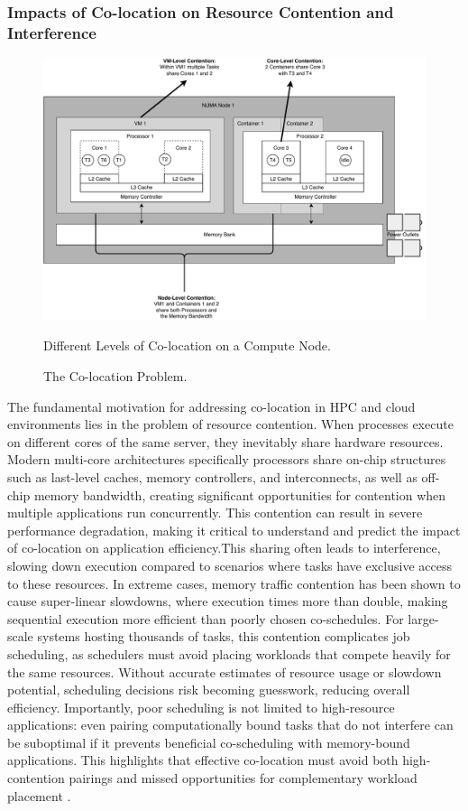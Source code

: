 \subsubsection{Impacts of Co-location on Resource Contention and Interference}
\label{sec:background_colocation_interference}

\begin{figure}[H]
    \centering
    \includegraphics[scale=0.5]{fig/02/02-coloc-overview.pdf}
    \caption{The Co-location Problem.}
    \label{fig:02-coloc-overview}
    \tiny
    Different Levels of Co-location on a Compute Node.
\end{figure}

The fundamental motivation for addressing co-location in HPC and cloud environments lies in the problem of resource contention. When processes execute on different cores of the same server, they inevitably share hardware resources. Modern multi-core architectures specifically processors share on-chip structures such as last-level caches, memory controllers, and interconnects, as well as off-chip memory bandwidth, creating significant opportunities for contention when multiple applications run concurrently. This contention can result in severe performance degradation, making it critical to understand and predict the impact of co-location on application efficiency.This sharing often leads to interference, slowing down execution compared to scenarios where tasks have exclusive access to these resources. In extreme cases, memory traffic contention has been shown to cause super-linear slowdowns, where execution times more than double, making sequential execution more efficient than poorly chosen co-schedules. For large-scale systems hosting thousands of tasks, this contention complicates job scheduling, as schedulers must avoid placing workloads that compete heavily for the same resources. Without accurate estimates of resource usage or slowdown potential, scheduling decisions risk becoming guesswork, reducing overall efficiency. Importantly, poor scheduling is not limited to high-resource applications: even pairing computationally bound tasks that do not interfere can be suboptimal if it prevents beneficial co-scheduling with memory-bound applications. This highlights that effective co-location must avoid both high-contention pairings and missed opportunities for complementary workload placement \cite{inproceedings} \cite{10.1007/978-3-031-48803-0_31}.

